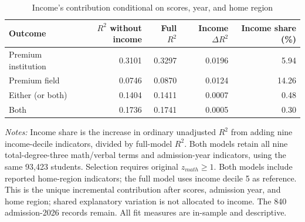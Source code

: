 \begin{table}[!htbp]\centering
\caption{Income's contribution conditional on scores, year, and home region}
\label{tab:region-d5-high-math-main-cubic-income-contribution}
\small
\begin{tabular}{lrrrr}\hline\hline
Outcome & $R^2$ without income & Full $R^2$ & Income $\Delta R^2$ & Income share (\%) \\ \hline
Premium institution & 0.3101 & 0.3297 & 0.0196 & 5.94 \\
Premium field & 0.0746 & 0.0870 & 0.0124 & 14.26 \\
Either (or both) & 0.1404 & 0.1411 & 0.0007 & 0.48 \\
Both & 0.1736 & 0.1741 & 0.0005 & 0.30 \\
\hline\hline\end{tabular}
\begin{minipage}{0.98\textwidth}\footnotesize
\textit{Notes:} Income share is the increase in ordinary unadjusted $R^2$ from adding nine income-decile indicators, divided by full-model $R^2$. Both models retain all nine total-degree-three math/verbal terms and admission-year indicators, using the same 93,423 students. Selection requires original $z_{math} \geq 1$. Both models include reported home-region indicators; the full model uses income decile 5 as reference. This is the unique incremental contribution after scores, admission year, and home region; shared explanatory variation is not allocated to income. The 840 admission-2026 records remain. All fit measures are in-sample and descriptive.
\end{minipage}
\end{table}
